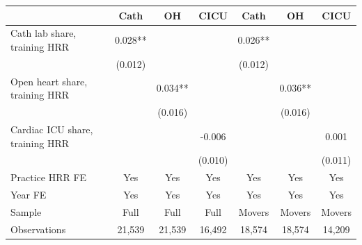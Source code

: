
\begin{tabular}{lcccccc}
\toprule
 & Cath & OH & CICU & Cath & OH & CICU\\
\midrule
Cath lab share, training HRR & 0.028** &  &  & 0.026** &  & \\
 & (0.012) &  &  & (0.012) &  & \\
\addlinespace
Open heart share, training HRR &  & 0.034** &  &  & 0.036** & \\
 &  & (0.016) &  &  & (0.016) & \\
\addlinespace
Cardiac ICU share, training HRR &  &  & -0.006 &  &  & 0.001\\
 &  &  & (0.010) &  &  & (0.011)\\
\midrule
Practice HRR FE & Yes & Yes & Yes & Yes & Yes & Yes\\
Year FE & Yes & Yes & Yes & Yes & Yes & Yes\\
Sample & Full & Full & Full & Movers & Movers & Movers\\
Observations & 21,539 & 21,539 & 16,492 & 18,574 & 18,574 & 14,209\\
\bottomrule
\end{tabular}
